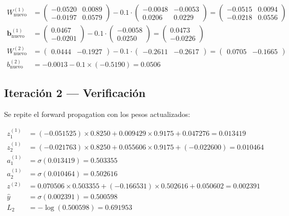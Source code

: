 \documentclass{article}
\begin{document}
\begin{align*}
  W^{(1)}_{\text{nuevo}} &=
    \begin{pmatrix} -0.0520 & 0.0089 \\ -0.0197 & 0.0579 \end{pmatrix}
    - 0.1 \cdot \begin{pmatrix} -0.0048 & -0.0053 \\ 0.0206 & 0.0229 \end{pmatrix}
    = \begin{pmatrix} \mathbf{-0.0515} & \mathbf{0.0094} \\ \mathbf{-0.0218} & \mathbf{0.0556} \end{pmatrix} \\[6pt]
  \mathbf{b}^{(1)}_{\text{nuevo}} &= \begin{pmatrix} 0.0467 \\ -0.0201 \end{pmatrix}
    - 0.1 \cdot \begin{pmatrix} -0.0058 \\ 0.0250 \end{pmatrix}
    = \begin{pmatrix} \mathbf{0.0473} \\ \mathbf{-0.0226} \end{pmatrix} \\[6pt]
  W^{(2)}_{\text{nuevo}} &= \begin{pmatrix} 0.0444 & -0.1927 \end{pmatrix}
    - 0.1 \cdot \begin{pmatrix} -0.2611 & -0.2617 \end{pmatrix}
    = \begin{pmatrix} \mathbf{0.0705} & \mathbf{-0.1665} \end{pmatrix} \\[6pt]
  b^{(2)}_{\text{nuevo}} &= -0.0013 - 0.1 \times (-0.5190) = \mathbf{0.0506}
\end{align*}
 
\subsection*{Iteración 2 --- Verificación}
 
Se repite el forward propagation con los pesos actualizados:
 
\begin{align*}
  z^{(1)}_1 &= (-0.051525) \times 0.8250 + 0.009429 \times 0.9175 + 0.047276 = \mathbf{0.013419} \\
  z^{(1)}_2 &= (-0.021763) \times 0.8250 + 0.055606 \times 0.9175 + (-0.022600) = \mathbf{0.010464} \\[4pt]
  a^{(1)}_1 &= \sigma(0.013419) = \mathbf{0.503355} \\
  a^{(1)}_2 &= \sigma(0.010464) = \mathbf{0.502616} \\[4pt]
  z^{(2)}   &= 0.070506 \times 0.503355 + (-0.166531) \times 0.502616 + 0.050602 = \mathbf{0.002391} \\
  \hat{y}   &= \sigma(0.002391) = \mathbf{0.500598} \\[4pt]
  L_2       &= -\log(0.500598) = \mathbf{0.691953}
\end{align*}
 
\end{document}

